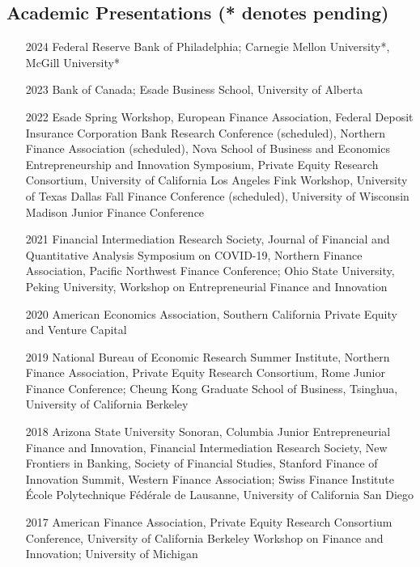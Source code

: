 \documentclass[11pt]{article}
\begin{document}
\subsection*{Academic Presentations (* denotes pending)}
\begin{itemize}
    \item[2024] Federal Reserve Bank of Philadelphia; Carnegie Mellon University*, McGill University*

    \item[2023] Bank of Canada; Esade Business School, University of Alberta

    \item[2022] Esade Spring Workshop, European Finance Association, Federal Deposit Insurance Corporation Bank Research Conference (scheduled), Northern Finance Association (scheduled), Nova School of Business and Economics Entrepreneurship and Innovation Symposium, Private Equity Research Consortium, University of California Los Angeles Fink Workshop, University of Texas Dallas Fall Finance Conference (scheduled), University of Wisconsin Madison Junior Finance Conference

    \item[2021] Financial Intermediation Research Society, Journal of Financial and Quantitative Analysis Symposium on COVID-19, Northern Finance Association, Pacific Northwest Finance Conference; Ohio State University, Peking University, Workshop on Entrepreneurial Finance and Innovation

    \item[2020] American Economics Association, Southern California Private Equity and Venture Capital

    \item[2019] National Bureau of Economic Research Summer Institute, Northern Finance Association, Private Equity Research Consortium, Rome Junior Finance Conference; Cheung Kong Graduate School of Business, Tsinghua, University of California Berkeley

    \item[2018] Arizona State University Sonoran, Columbia Junior Entrepreneurial Finance and Innovation, Financial Intermediation Research Society, New Frontiers in Banking, Society of Financial Studies, Stanford Finance of Innovation Summit, Western Finance Association; Swiss Finance Institute École Polytechnique Fédérale de Lausanne, University of California San Diego

    \item[2017] American Finance Association, Private Equity Research Consortium Conference, University of California Berkeley Workshop on Finance and Innovation; University of Michigan


\end{itemize}
\end{document}
